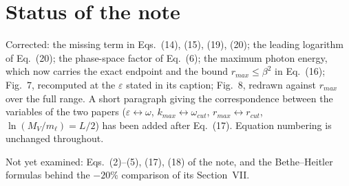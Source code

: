 \documentclass[11pt]{article}
\begin{document}
\section{Status of the note}

Corrected: the missing term in Eqs.~(14), (15), (19), (20); the leading
logarithm of Eq.~(20); the phase-space factor of Eq.~(6); the maximum photon
energy, which now carries the exact endpoint and the bound
$r_{max}\le\beta^{2}$ in Eq.~(16); Fig.~7, recomputed at the $\varepsilon$ stated
in its caption; Fig.~8, redrawn against $r_{max}$ over the full range. A short
paragraph giving the correspondence between the variables of the two papers
($\varepsilon\leftrightarrow\omega$, $k_{max}\leftrightarrow\omega_{cut}$,
$r_{max}\leftrightarrow r_{cut}$, $\ln(M_V/m_\ell)=L/2$) has been added after
Eq.~(17). Equation numbering is unchanged throughout.

Not yet examined: Eqs.~(2)--(5), (17), (18) of the note, and the Bethe--Heitler
formulas behind the $-20\%$ comparison of its Section~VII.
\end{document}
